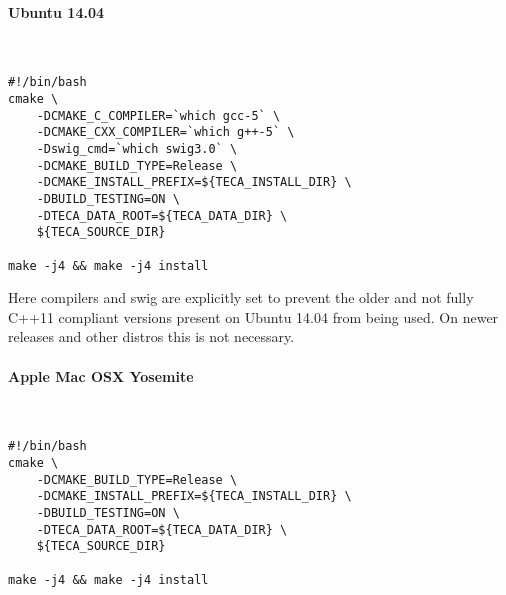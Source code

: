 \documentclass[a4paper,10pt,DIV=12]{scrreprt}
\begin{document}
\paragraph{Ubuntu 14.04} $\;$ \\ \\
\vspace{0mm}\hspace{0.2in}\begin{minipage}{0.8\textwidth}
\begin{verbatim}
#!/bin/bash
cmake \
    -DCMAKE_C_COMPILER=`which gcc-5` \
    -DCMAKE_CXX_COMPILER=`which g++-5` \
    -Dswig_cmd=`which swig3.0` \
    -DCMAKE_BUILD_TYPE=Release \
    -DCMAKE_INSTALL_PREFIX=${TECA_INSTALL_DIR} \
    -DBUILD_TESTING=ON \
    -DTECA_DATA_ROOT=${TECA_DATA_DIR} \
    ${TECA_SOURCE_DIR}

make -j4 && make -j4 install
\end{verbatim}
\end{minipage}\vspace{2mm}

\noindent Here compilers and swig are explicitly set to prevent the older and not fully C++11
compliant versions present on Ubuntu 14.04 from being used. On newer releases and other distros
this is not necessary.

\paragraph{Apple Mac OSX Yosemite} $\;$ \\ \\
\vspace{0mm}\hspace{0.2in}\begin{minipage}{0.8\textwidth}
\begin{verbatim}
#!/bin/bash
cmake \
    -DCMAKE_BUILD_TYPE=Release \
    -DCMAKE_INSTALL_PREFIX=${TECA_INSTALL_DIR} \
    -DBUILD_TESTING=ON \
    -DTECA_DATA_ROOT=${TECA_DATA_DIR} \
    ${TECA_SOURCE_DIR}

make -j4 && make -j4 install
\end{verbatim}
\end{minipage}\vspace{2mm}
%
%
\end{document}
